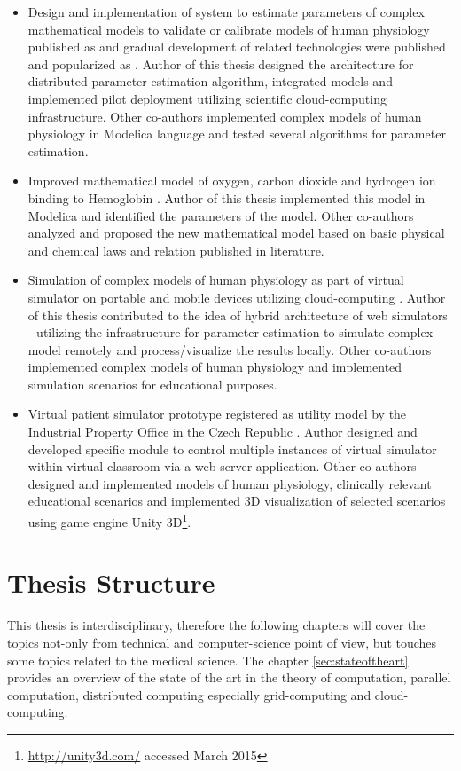 \begin{itemize}
\item Design and implementation of system to estimate parameters of complex mathematical models to validate or calibrate models of human physiology published as \cite{Kulhanek2014Parameters} and gradual development of related technologies were published and popularized as \cite{Kulhanek2010, Kulhanek2013c, Kulhanek2011, Kulhanek2014}. Author of this thesis designed the architecture for distributed parameter estimation algorithm, integrated models and implemented pilot deployment utilizing scientific cloud-computing infrastructure. Other co-authors implemented complex models of human physiology in Modelica language and tested several algorithms for parameter estimation.
\item Improved mathematical model of oxygen, carbon dioxide and hydrogen ion binding to Hemoglobin \cite{Matejak2014sj}. Author of this thesis implemented this model in Modelica and identified the parameters of the model. Other co-authors analyzed and proposed the new mathematical model based on basic physical and chemical laws and relation published in literature.
\item Simulation of complex models of human physiology as part of virtual simulator on portable and mobile devices utilizing cloud-computing \cite{Kulhanek2013c,Kulhanek2013b}. Author of this thesis contributed to the idea of hybrid architecture of web simulators - utilizing the infrastructure for parameter estimation to simulate complex model remotely and process/visualize the results locally. Other co-authors implemented complex models of human physiology and implemented simulation scenarios for educational purposes.
\item Virtual patient simulator prototype registered as utility model by the Industrial Property Office in the Czech Republic \cite{Kofranek2014a}. Author designed and developed specific module to control multiple instances of virtual simulator within virtual classroom via a web server application. Other co-authors designed and implemented models of human physiology, clinically relevant educational scenarios and implemented 3D visualization of selected scenarios using game engine Unity 3D\footnote{\url{http://unity3d.com/} accessed March 2015}.
\end{itemize}

\section{Thesis Structure}
This thesis is interdisciplinary, therefore the following chapters will cover the topics not-only from technical and computer-science point of view, but touches some topics related to the medical science.
The chapter \ref{sec:stateoftheart} provides an overview of the state of the art in the theory of computation, parallel computation, distributed computing especially grid-computing and cloud-computing. 

